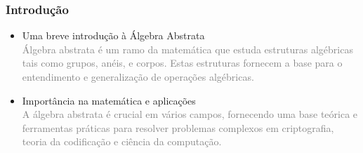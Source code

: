 \begin{frame}
\frametitle{Introdução}
\begin{itemize}
    \item Uma breve introdução à Álgebra Abstrata\\
    \textcolor{gray}{Álgebra abstrata é um ramo da matemática que estuda estruturas algébricas tais como \textcolor[gray]{0.2}{grupos, anéis, e corpos}. 
    Estas estruturas fornecem a base para o entendimento e generalização de operações algébricas.}
    \item Importância na matemática e aplicações\\
    \textcolor{gray}{A álgebra abstrata é crucial em vários campos, fornecendo uma base teórica e ferramentas práticas para resolver problemas complexos em
    \textcolor[gray]{0.2}{criptografia, teoria da codificação e ciência da computação}.}
\end{itemize}
\end{frame}

